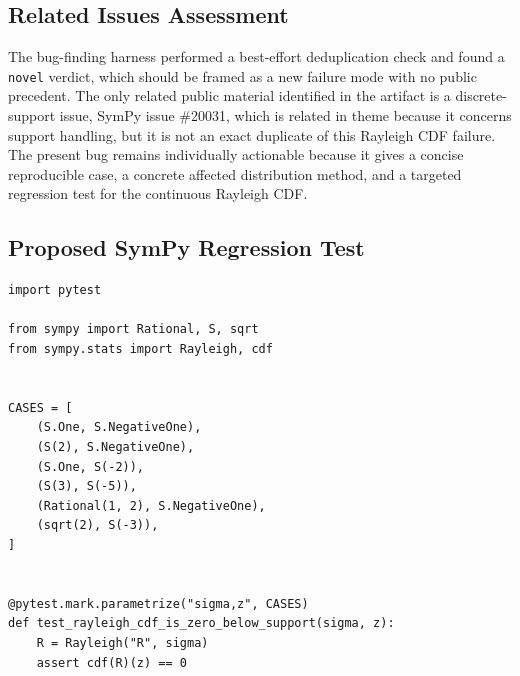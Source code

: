 \documentclass[11pt]{article}
\begin{document}
\subsection{Related Issues Assessment}

The bug-finding harness performed a best-effort deduplication check and found a
\texttt{novel} verdict, which should be framed as a new failure mode with no
public precedent.  The only related public material identified in the artifact
is a discrete-support issue, SymPy issue \#20031, which is related in theme
because it concerns support handling, but it is not an exact duplicate of this
Rayleigh CDF failure.  The present bug remains individually actionable because
it gives a concise reproducible case, a concrete affected distribution method,
and a targeted regression test for the continuous Rayleigh CDF.

\subsection{Proposed SymPy Regression Test}

\medskip

\begin{lstlisting}[style=bugpython]
import pytest

from sympy import Rational, S, sqrt
from sympy.stats import Rayleigh, cdf


CASES = [
    (S.One, S.NegativeOne),
    (S(2), S.NegativeOne),
    (S.One, S(-2)),
    (S(3), S(-5)),
    (Rational(1, 2), S.NegativeOne),
    (sqrt(2), S(-3)),
]


@pytest.mark.parametrize("sigma,z", CASES)
def test_rayleigh_cdf_is_zero_below_support(sigma, z):
    R = Rayleigh("R", sigma)
    assert cdf(R)(z) == 0
\end{lstlisting}
\end{document}
